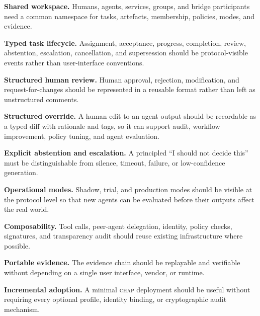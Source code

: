 \documentclass[11pt]{article}
\newcommand{\chap}{\textsc{chap}}
\begin{document}
\begin{description}[leftmargin=!,labelwidth=1.2cm]
    \item[R1] \textbf{Shared workspace.} Humans, agents, services, groups, and bridge participants need a common namespace for tasks, artefacts, membership, policies, modes, and evidence.

    \item[R2] \textbf{Typed task lifecycle.} Assignment, acceptance, progress, completion, review, abstention, escalation, cancellation, and supersession should be protocol-visible events rather than user-interface conventions.

    \item[R3] \textbf{Structured human review.} Human approval, rejection, modification, and request-for-changes should be represented in a reusable format rather than left as unstructured comments.

    \item[R4] \textbf{Structured override.} A human edit to an agent output should be recordable as a typed diff with rationale and tags, so it can support audit, workflow improvement, policy tuning, and agent evaluation.

    \item[R5] \textbf{Explicit abstention and escalation.} A principled ``I should not decide this'' must be distinguishable from silence, timeout, failure, or low-confidence generation.

    \item[R6] \textbf{Operational modes.} Shadow, trial, and production modes should be visible at the protocol level so that new agents can be evaluated before their outputs affect the real world.

    \item[R7] \textbf{Composability.} Tool calls, peer-agent delegation, identity, policy checks, signatures, and transparency audit should reuse existing infrastructure where possible.

    \item[R8] \textbf{Portable evidence.} The evidence chain should be replayable and verifiable without depending on a single user interface, vendor, or runtime.

    \item[R9] \textbf{Incremental adoption.} A minimal \chap{} deployment should be useful without requiring every optional profile, identity binding, or cryptographic audit mechanism.
\end{description}
\end{document}
